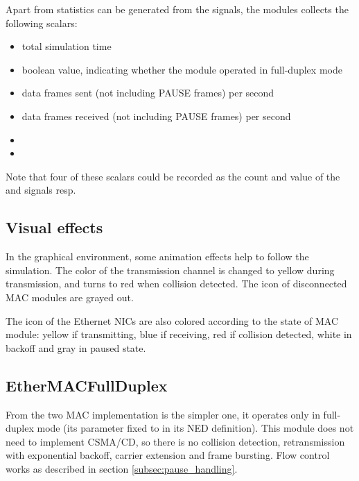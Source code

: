 
Apart from statistics can be generated from the signals, the modules collects
the following scalars:

\begin{itemize}
  \item {} total simulation time
  \item {} boolean value, indicating whether the module operated
          in full-duplex mode
  \item {} data frames sent (not including PAUSE frames) per second
  \item {} data frames received (not including PAUSE frames) per second
  \item {}
  \item {}
\end{itemize}

Note that four of these scalars could be recorded as the count and value of the 
and  signals resp.

\subsection*{Visual effects}

In the graphical environment, some animation effects help to follow the simulation.
The color of the transmission channel is changed to yellow during transmission, and
turns to red when collision detected. The icon of disconnected MAC modules are grayed out.

The icon of the Ethernet NICs are also colored according to the state of MAC module:
yellow if transmitting, blue if receiving, red if collision detected, white in backoff
and gray in paused state.
 



\subsection{EtherMACFullDuplex}

From the two MAC implementation  is the simpler one,
it operates only in full-duplex mode (its  parameter fixed to
 in its NED definition). This module does not need to implement
CSMA/CD, so there is no collision detection, retransmission with exponential backoff,
carrier extension and frame bursting. Flow control works as described in section
\ref{subsec:pause_handling}.

